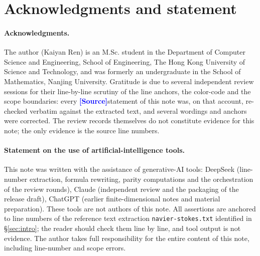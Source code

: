 \documentclass[11pt,a4paper]{article}
\theoremstyle{definition}
\theoremstyle{remark}
\newcommand{\ORIG}{\textcolor{blue}{\textbf{[Source]}}}
\begin{document}
\section{Acknowledgments and statement}
\label{sec:ack}

\paragraph{Acknowledgments.}
The author (Kaiyan Ren) is an M.Sc. student in the Department of Computer Science and Engineering,
School of Engineering, The Hong Kong University of Science and Technology, and was formerly an
undergraduate in the School of Mathematics, Nanjing University.
Gratitude is due to several independent review sessions for their line-by-line scrutiny of the line
anchors, the color-code and the scope boundaries: every \ORIG statement of this note was, on that
account, re-checked verbatim against the extracted text, and several wordings and anchors were corrected.
The review records themselves do not constitute evidence for this note; the only evidence is the source
line numbers.

\paragraph{Statement on the use of artificial-intelligence tools.}
This note was written with the assistance of generative-AI tools: DeepSeek (line-number extraction,
formula rewriting, parity computations and the orchestration of the review rounds), Claude (independent
review and the packaging of the release draft), ChatGPT (earlier finite-dimensional notes and material
preparation). These tools are not authors of this note. All assertions are anchored to line numbers of
the reference text extraction \nolinkurl{navier-stokes.txt} identified in \S\ref{sec:intro}; the reader
should check them line by line, and tool output is not evidence. The author takes full responsibility for the entire content of this note,
including line-number and scope errors.
\end{document}
